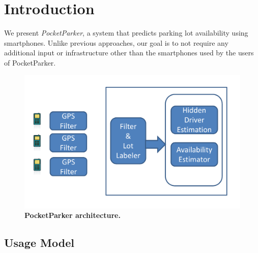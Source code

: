 \section{Introduction}

We present \emph{PocketParker}, a system that predicts parking lot availability
using smartphones. Unlike previous approaches, our goal is to not require any
additional input or infrastructure other than the smartphones used by the users
of PocketParker.

\begin{figure}
\centering
\includegraphics[width=\columnwidth]{./figures/blockdiagram.pdf}

\caption{\textbf{PocketParker architecture.}}

\label{fig-arch}
\end{figure}

\subsection{Usage Model}
